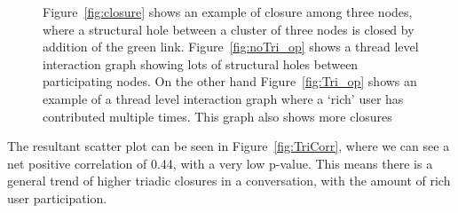 \begin{figure}[!ht]
    \centering

    \caption{ Figure~\ref{fig:closure} shows an example of closure among three nodes, where a structural hole between a cluster of three nodes is closed by addition of the green link. Figure~\ref{fig:noTri_op} shows a thread level interaction graph showing lots of structural holes between participating nodes. On the other hand Figure~\ref{fig:Tri_op} shows an example of a thread level interaction graph where a `rich' user has contributed multiple times. This graph also shows more closures }
\end{figure}

The resultant scatter plot can be seen in Figure~\ref{fig:TriCorr}, where we can see a net positive correlation of 0.44, with a very low p-value. This means there is a general trend of higher triadic closures in a conversation, with the amount of rich user participation.
 
